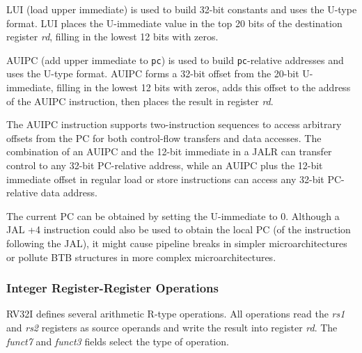 LUI (load upper immediate) is used to build 32-bit constants and uses
the U-type format.  LUI places the U-immediate value in the top 20
bits of the destination register {\em rd}, filling in the lowest 12
bits with zeros.

AUIPC (add upper immediate to {\tt pc}) is used to build {\tt pc}-relative
addresses and uses the U-type format.  AUIPC forms a 32-bit offset from the
20-bit U-immediate, filling in the lowest 12 bits with zeros, adds this offset
to the address of the AUIPC instruction, then places the result in register {\em rd}.

\begin{commentary}
The AUIPC instruction supports two-instruction sequences to access
arbitrary offsets from the PC for both control-flow transfers and data
accesses.  The combination of an AUIPC and the 12-bit immediate in a
JALR can transfer control to any 32-bit PC-relative address, while an
AUIPC plus the 12-bit immediate offset in regular load or store
instructions can access any 32-bit PC-relative data address.

The current PC can be obtained by setting the U-immediate to 0.
Although a JAL +4 instruction could also be used to obtain the local
PC (of the instruction following the JAL), it might cause pipeline
breaks in simpler microarchitectures or pollute BTB structures in more
complex microarchitectures.
\end{commentary}

\subsubsection*{Integer Register-Register Operations}

RV32I defines several arithmetic R-type operations.  All operations
read the {\em rs1} and {\em rs2} registers as source operands and
write the result into register {\em rd}.  The {\em funct7} and {\em
  funct3} fields select the type of operation.

